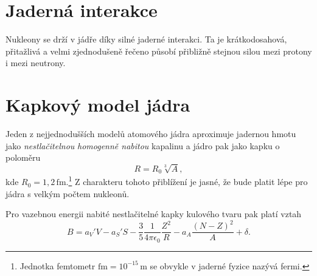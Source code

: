 \documentclass[a4paper,12pt,oneside]{article}
\def\unit#1{\,\mathrm{#1}}
\def\c{,\!}                             %
\theoremstyle{red}
\begin{document}
\section{Jaderná interakce}
    Nukleony se drží v jádře díky silné jaderné interakci. 
    Ta je krátkodosahová, přitažlivá a velmi zjednodušeně řečeno působí přibližně stejnou silou mezi protony i mezi neutrony.
    
\section{Kapkový model jádra}
    Jeden z nejjednodušších modelů atomového jádra aproximuje jadernou hmotu jako \emph{nestlačitelnou} \emph{homogenně nabitou} kapalinu a jádro pak jako kapku o poloměru
    \begin{equation}
        R=R_{0}\sqrt[3]{A},
    \end{equation}
    kde $R_{0}=1\c2\unit{fm}$.\footnote{Jednotka femtometr $\mathrm{fm}=10^{-15}\unit{m}$ se obvykle v jaderné fyzice nazývá fermi.}
    Z charakteru tohoto přiblížení je jasné, že bude platit lépe pro jádra s velkým počtem nukleonů.

    Pro vazebnou energii nabité nestlačitelné kapky kulového tvaru pak platí vztah
    \begin{equation}
        \label{eq:BetheWeizsackerVS}
        B=a_{V}'V-a_{S}'S-\frac{3}{5}\frac{1}{4\pi\epsilon_{0}}\frac{Z^{2}}{R}-a_{A}\frac{\left(N-Z\right)^{2}}{A}+\delta.
    \end{equation}
\end{document}
